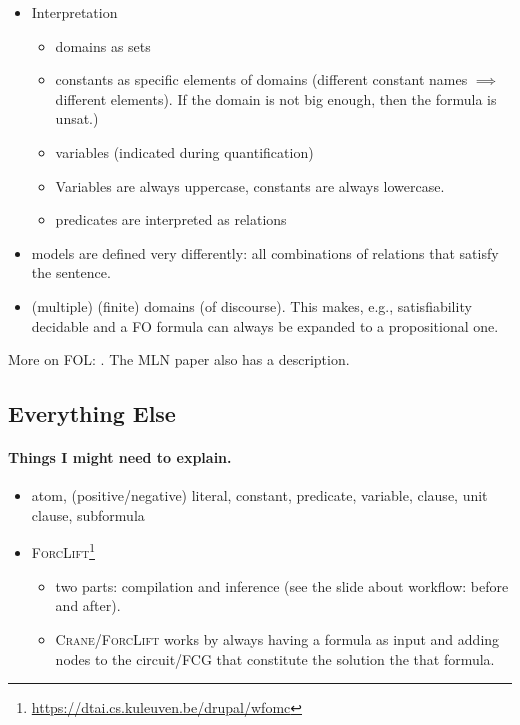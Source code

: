 
\begin{itemize}
  \item Interpretation
        \begin{itemize}
          \item domains as sets
          \item constants as specific elements of domains (different constant
                names $\implies$ different elements). If the domain is not big
                enough, then the formula is unsat.)
          \item variables (indicated during quantification)
          \item Variables are always uppercase, constants are always lowercase.
          \item predicates are interpreted as relations
        \end{itemize}
  \item models are defined very differently: all combinations of relations that
        satisfy the sentence.
  \item (multiple) (finite) domains (of discourse). This makes, e.g.,
        satisfiability decidable and a FO formula can always be expanded to a
        propositional one.
\end{itemize}

More on FOL: \citep{DBLP:books/daglib/0023546}. The MLN paper also has a
description.

\subsection{Everything Else}

\paragraph{Things I might need to explain.}
\begin{itemize}
  \item atom, (positive/negative) literal, constant, predicate, variable,
        clause, unit clause, subformula
  \item \textsc{ForcLift}\footnote{\url{https://dtai.cs.kuleuven.be/drupal/wfomc}}
  \begin{itemize}
  \item two parts: compilation and inference (see the slide about workflow:
        before and after).
  \item \textsc{Crane/ForcLift} works by always having a formula as input and
        adding nodes to the circuit/FCG that constitute the solution the that
        formula.
  \end{itemize}
\end{itemize}


